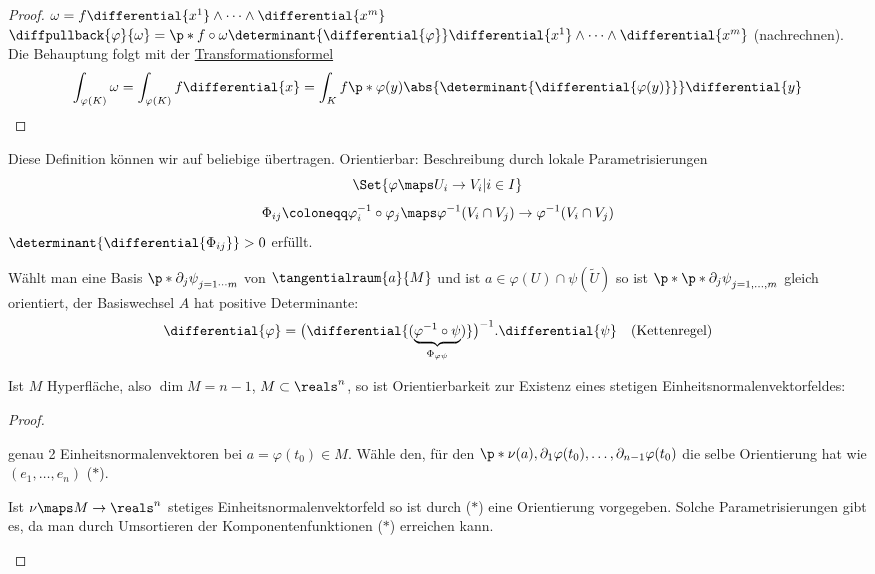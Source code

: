 \begin{proof}
  \( \omega=f\differential{x^1}\wedge\dotsb \wedge\differential{x^m} \) \timplies
  \( \diffpullback{\varphi}{\omega}=\p*{ f\circ\omega }\determinant{\differential{\varphi}}\differential{x^1}\wedge\dotsb \wedge\differential{x^m} \) (nachrechnen).
  Die Behauptung folgt mit der \hyperref[transformationssatz]{Transformationsformel}
  \begin{equation*}
      \int_{\varphi(K)}\omega=\int_{\varphi(K)}f\differential{x}=\int_{K}f\p*{ \varphi(y) }\abs{\determinant{\differential{\varphi(y)}}}\differential{y}
  \end{equation*}
\end{proof}

Diese Definition können wir auf beliebige  übertragen.
Orientierbar: \texists Beschreibung durch lokale Parametrisierungen 
\begin{equation*}
  \Set{\varphi\maps U_i\to V_i|i\in I}
\end{equation*}
\sd 
\begin{equation*}
  \Phi_{ij}\coloneqq \varphi^{-1}_i\circ\varphi_j\maps\varphi^{-1}(V_i\cap V_j)\to\varphi^{-1}(V_i\cap V_j)
\end{equation*}
\( \determinant{ \differential{\Phi_{ij}}}>0 \) erfüllt.

Wählt man eine Basis \( \p*{ \partial_j\psi }_{j=1\cdots m} \) von \( \tangentialraum{a}{M} \) und ist \( a\in\varphi(U)\cap\psi(\tilde{U}) \) so ist \( \p*{\p*{ \partial_j\psi }_{j=1,\dotsc, m}  } \) gleich orientiert, \dh der Basiswechsel \( A \) hat positive Determinante:
\begin{equation*}
  \differential{\varphi}=\big(\differential{(\underbrace{\varphi^{-1}\circ\psi}_{\Phi_{\varphi\psi}})}\big)^{-1}.\differential{\psi}\quad \text{(Kettenregel)}
\end{equation*}

\begin{bemerkung}
    Ist \( M \) Hyperfläche, also \( \dim M=n-1 \), \( M\subset\reals^n \), so ist Orientierbarkeit zur Existenz eines stetigen Einheitsnormalenvektorfeldes:
\end{bemerkung}
\begin{proof}
  \begin{proofdescription}
    \item[\hin] \texists genau 2 Einheitsnormalenvektoren bei \( a=\varphi(t_0)\in M \).
    Wähle den, für den \( \p*{ \nu(a),\partial_1\varphi(t_0),\dotsc ,\partial_{n-1}\varphi(t_0) } \) die selbe Orientierung hat wie \( (e_1,\dotsc ,e_n) \) (\( * \)).
    \item[\rueck] Ist \( \nu\maps M\to \reals^n \) stetiges Einheitsnormalenvektorfeld so ist durch (\( * \)) eine Orientierung vorgegeben.
    Solche Parametrisierungen gibt es, da man durch Umsortieren der Komponentenfunktionen (\( * \)) erreichen kann.
  \end{proofdescription}
  
\end{proof}
      

